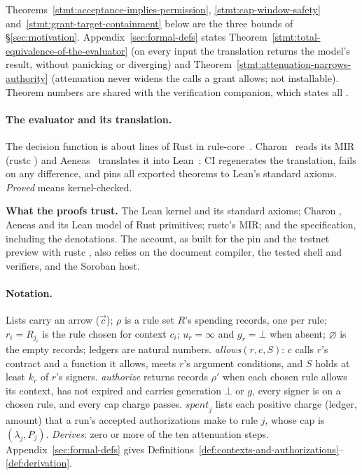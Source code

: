 Theorems~\ref{stmt:acceptance-implies-permission},
\ref{stmt:cap-window-safety} and~\ref{stmt:grant-target-containment} below are
the three bounds of \S\ref{sec:motivation}. Appendix~\ref{sec:formal-defs}
states Theorem~\ref{stmt:total-equivalence-of-the-evaluator} (on every input the
translation returns the model's result, without panicking or diverging) and
Theorem~\ref{stmt:attenuation-narrows-authority} (attenuation never widens the
calls a grant allows; not installable). Theorem numbers are shared with the
verification companion, which states all .

\paragraph{The evaluator and its translation.} The decision function is about
 lines of  Rust in
rule-core~. Charon~\cite{charon} reads its MIR (rustc
) and Aeneas~\cite{aeneas} translates it into
Lean~\cite{lean4}; CI
regenerates the translation, fails on any difference, and pins all
 exported theorems to Lean's standard axioms.
\emph{Proved} means kernel-checked.


\begin{perchbox}
\textbf{What the proofs trust.} The Lean kernel and its standard axioms; Charon
, Aeneas  and its Lean model of Rust
primitives; rustc's MIR; and the specification, including the denotations. The
account, as built for the pin and the testnet preview with rustc
, also relies on the document compiler, the tested shell and
verifiers, and the Soroban host.
\end{perchbox}

\paragraph{Notation.} Lists carry an arrow ($\vec c$); $\rho$ is a rule set
$R$'s spending records, one per rule; $r_i = R_{j_i}$ is the rule chosen for
context $c_i$; $u_r = \infty$ and $g_r = \bot$ when absent; $\varnothing$ is
the empty records; ledgers are natural numbers. \emph{allows}$(r, c, S)$: $c$
calls $r$'s contract and a function it allows, meets $r$'s argument
conditions, and $S$ holds at least $k_r$ of $r$'s signers. \emph{authorize}
returns records $\rho'$ when each chosen rule allows its context, has not
expired and carries generation $\bot$ or $g$, every signer is on a chosen
rule, and every cap charge passes. $\mathit{spent}_j$ lists each positive
charge (ledger, amount) that a run's accepted authorizations make to rule $j$,
whose cap is $(\lambda_j, P_j)$. \emph{Derives}: zero or more of the ten
attenuation steps. Appendix~\ref{sec:formal-defs} gives
Definitions~\ref{def:contexts-and-authorizations}--\ref{def:derivation}.




